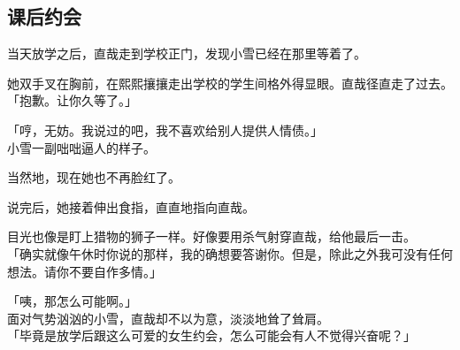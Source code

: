 \subsection{课后约会}

当天放学之后，直哉走到学校正门，发现小雪已经在那里等着了。

她双手叉在胸前，在熙熙攘攘走出学校的学生间格外得显眼。直哉径直走了过去。\\

「抱歉。让你久等了。」

「哼，无妨。我说过的吧，我不喜欢给别人提供人情债。」\\

小雪一副咄咄逼人的样子。

当然地，现在她也不再脸红了。

说完后，她接着伸出食指，直直地指向直哉。

目光也像是盯上猎物的狮子一样。好像要用杀气射穿直哉，给他最后一击。\\

「确实就像午休时你说的那样，我的确想要答谢你。但是，除此之外我可没有任何想法。请你不要自作多情。」

「咦，那怎么可能啊。」\\

面对气势汹汹的小雪，直哉却不以为意，淡淡地耸了耸肩。\\

「毕竟是放学后跟这么可爱的女生约会，怎么可能会有人不觉得兴奋呢？」

